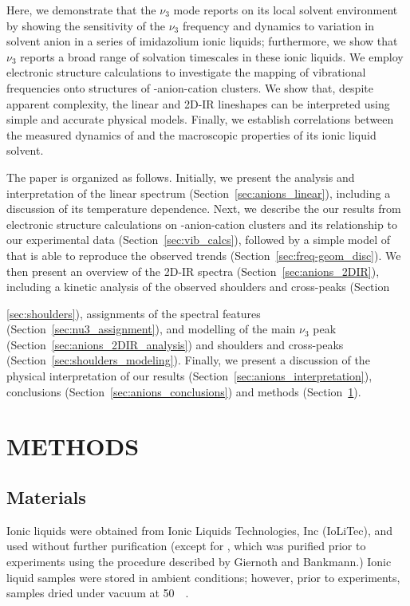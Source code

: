 Here, we demonstrate that the  $\nu_3$ mode reports on its local solvent environment by showing the sensitivity of the $\nu_3$ frequency and dynamics to variation in solvent anion in a series of imidazolium ionic liquids; furthermore, we show that $\nu_3$ reports a broad range of solvation timescales in these ionic liquids. We employ electronic structure calculations to investigate the mapping of vibrational frequencies onto structures of -anion-cation clusters. We show that, despite apparent complexity, the  linear and 2D-IR lineshapes can be interpreted using simple and accurate physical models. Finally, we establish correlations between the measured dynamics of  and the macroscopic properties of its ionic liquid solvent.

The paper is organized as follows. Initially, we present the analysis and interpretation of the linear  spectrum (Section~\ref{sec:anions_linear}), including a discussion of its temperature dependence. Next, we describe the our results from electronic structure calculations on -anion-cation clusters and its relationship to our experimental data (Section~\ref{sec:vib_calcs}), followed by a simple model of  that is able to reproduce the observed trends (Section~\ref{sec:freq-geom_disc}). We then present an overview of the 2D-IR spectra (Section~\ref{sec:anions_2DIR}), including a kinetic analysis of the observed shoulders and cross-peaks (Section~{\ref{sec:shoulders}), assignments of the spectral features (Section~\ref{sec:nu3_assignment}), and modelling of the main $\nu_3$ peak (Section~\ref{sec:anions_2DIR_analysis}) and shoulders and cross-peaks (Section~\ref{sec:shoulders_modeling}). Finally, we present a discussion of the physical interpretation of our results (Section~\ref{sec:anions_interpretation}), conclusions (Section~\ref{sec:anions_conclusions}) and methods (Section~\ref{sec:anions_methods}).

\section{METHODS}
\label{sec:anions_methods}
\subsection{Materials}

Ionic liquids were obtained from Ionic Liquids Technologies, Inc (IoLiTec), and used without further purification (except for \ce{[Im_{4,1}][BF4]}, which was purified prior to experiments using the procedure described by Giernoth and Bankmann.\cite{Giernoth2008}) Ionic liquid samples were stored in ambient conditions; however, prior to experiments, samples dried under vacuum at \SI{50}{\milli\torr}.

}

